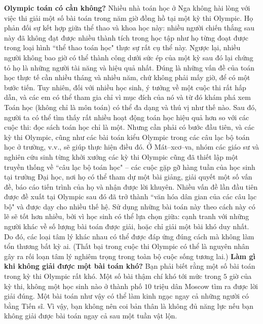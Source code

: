 \begin{multicols}{2}
	\textbf{\color{cackithi}Olympic toán có cần không?}
	\vskip 0.1cm 
	Nhiều nhà toán học ở Nga không hài lòng với việc thi giải một số bài toán trong năm giờ đồng hồ tại một kỳ thi Olympic. Họ phản đối sự kết hợp giữa thể thao và khoa học này: nhiều người chiến thắng sau này đã không đạt được nhiều thành tích trong học tập như họ từng đoạt được trong loại hình ``thể thao toán học" thực sự rất cụ thể này. Ngược lại, nhiều người không bao giờ có thể thành công dưới sức ép của một kỳ sau đó lại chứng tỏ họ là những người tài năng và hiệu quả nhất. Đúng là những vấn đề của toán học thực tế cần nhiều tháng và nhiều năm, chứ không phải mấy giờ, để có một bước tiến.
	\vskip 0.1cm
	Tuy nhiên, đối với nhiều học sinh, ý tưởng về một cuộc thi rất hấp dẫn, và các em có thể tham gia chỉ vì mục đích của nó và từ đó khám phá xem Toán học (không chỉ là môn toán) có thể đa dạng và thú vị như thế nào. Sau đó, người ta có thể tìm thấy rất nhiều hoạt động toán học hiệu quả hơn so với các cuộc thi: đọc sách toán học chỉ là một. Nhưng cần phải có bước đầu tiên, và các kỳ thi Olympic, cũng như các bài toán kiểu Olympic trong các câu lạc bộ toán học ở trường, v.v., sẽ giúp thực hiện điều đó.
	\vskip 0.1cm
	Ở Mát--xcơ--va, nhóm các giáo sư và nghiên cứu sinh từng khởi xướng các kỳ thi Olympic cũng đã thiết lập một truyền thống về ``câu lạc bộ toán học" -- các cuộc gặp gỡ hàng tuần của học sinh tại trường Đại học, nơi họ có thể tham dự một bài giảng, giải quyết một số vấn đề, báo cáo tiến trình của họ và nhận được lời khuyên. Nhiều vấn đề lần đầu tiên được đề xuất tại Olympic sau đó đã trở thành ``văn hóa dân gian của các câu lạc bộ" và được dạy cho nhiều thế hệ.
	\vskip 0.1cm
	Sử dụng những bài toán này theo cách này có lẽ sẽ tốt hơn nhiều, bởi vì học sinh có thể lựa chọn giữa: cạnh tranh với những người khác về số lượng bài toán được giải, hoặc chỉ giải một bài khó duy nhất. Do đó, các loại tâm lý khác nhau có thể được đáp ứng đúng cách mà không làm tổn thương bất kỳ ai. (Thất bại trong cuộc thi Olympic có thể là nguyên nhân gây ra rối loạn tâm lý nghiêm trọng trong toàn bộ cuộc sống tương lai.)
	\vskip 0.1cm
	\textbf{\color{cackithi}Làm gì khi không giải được một bài toán khó?}
	\vskip 0.1cm 
	Bạn phải biết rằng một số bài toán trong kỳ thi Olympic rất khó. Một số bài thậm chí khó tới mức trong $5$ giờ của kỳ thi, không một học sinh nào ở thành phố $10$ triệu dân Moscow tìm ra được lời giải đúng. Một bài toán như vậy có thể làm kinh ngạc ngay cả những người có bằng Tiến sĩ. Vì vậy, bạn không nên coi bản thân là không đủ năng lực nếu bạn không giải được bài toán ngay cả sau một tuần vật lộn.

\end{multicols}

